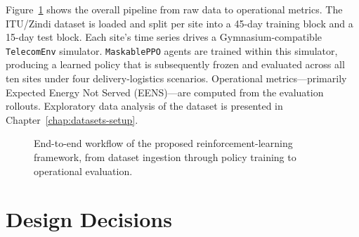 Figure~\ref{fig:workflow} shows the overall pipeline from raw data to
operational metrics. The ITU/Zindi dataset is loaded and split per site
into a 45-day training block and a 15-day test block. Each site's time
series drives a Gymnasium-compatible \texttt{TelecomEnv} simulator.
\texttt{MaskablePPO} agents are trained within this simulator, producing a
learned policy that is subsequently frozen and evaluated across all ten
sites under four delivery-logistics scenarios. Operational
metrics---primarily Expected Energy Not Served (EENS)---are computed from
the evaluation rollouts. Exploratory data analysis of the dataset is
presented in Chapter~\ref{chap:datasets-setup}.

\begin{figure}[htbp]
\centering
{}
\caption{End-to-end workflow of the proposed reinforcement-learning
framework, from dataset ingestion through policy training to operational
evaluation.}
\label{fig:workflow}
\end{figure}


\section{Design Decisions}
\label{sec:rationale}

